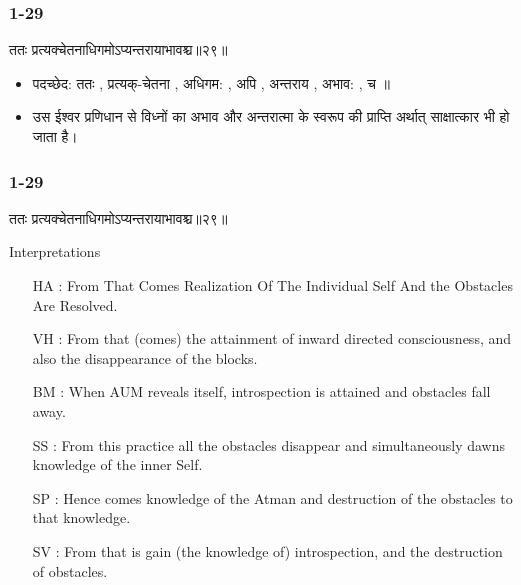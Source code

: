 \begin{frame}[fragile]\frametitle{1-29}
\begin{sanskrit}
ततः प्रत्यक्चेतनाधिगमोऽप्यन्तरायाभावश्च॥२९॥
\end{sanskrit}

\begin{itemize}
\item पदच्छेद: ततः , प्रत्यक्-चेतना , अधिगम: , अपि , अन्तराय , अभाव: , च ॥
\item उस ईश्वर प्रणिधान से विध्नों का अभाव और अन्तरात्मा के स्वरूप की प्राप्ति अर्थात् साक्षात्कार भी हो जाता है।
\end{itemize}
	
\end{frame}


\begin{frame}[fragile]\frametitle{1-29}
\begin{sanskrit}
ततः प्रत्यक्चेतनाधिगमोऽप्यन्तरायाभावश्च॥२९॥
\end{sanskrit}

Interpretations
\begin{itemize}	
\item [HA]: From That Comes Realization Of The Individual Self And the Obstacles Are Resolved.
\item [VH]: From that (comes) the attainment of inward directed consciousness, and also the disappearance of the blocks.
\item [BM]: When AUM reveals itself, introspection is attained and obstacles fall away.
\item [SS]: From this practice all the obstacles disappear and simultaneously dawns knowledge of the inner Self.
\item [SP]: Hence comes knowledge of the Atman and destruction of the obstacles to that knowledge.
\item [SV]: From that is gain (the knowledge of) introspection, and the destruction of obstacles. 
\end{itemize}
	
\end{frame}


